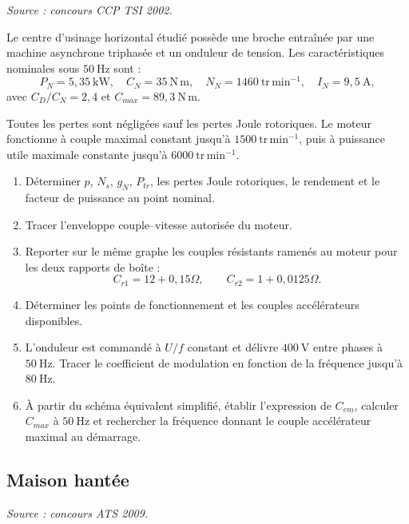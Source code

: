 \textit{Source : concours CCP TSI 2002.}

\begin{minipage}{.72\linewidth}
Le centre d'usinage horizontal étudié possède une broche entraînée par une machine asynchrone triphasée et un onduleur de tension. Les caractéristiques nominales sous $50\ \mathrm{Hz}$ sont :
\[
P_N=5{,}35\ \mathrm{kW},\quad C_N=35\ \mathrm{N\,m},\quad
N_N=1460\ \mathrm{tr\,min^{-1}},\quad I_N=9{,}5\ \mathrm A,
\]
avec $C_D/C_N=2{,}4$ et $C_{max}=89{,}3\ \mathrm{N\,m}$.
\end{minipage}\hfill
\begin{minipage}{.24\linewidth}
\end{minipage}

Toutes les pertes sont négligées sauf les pertes Joule rotoriques. Le moteur fonctionne à couple maximal constant jusqu'à $1500\ \mathrm{tr\,min^{-1}}$, puis à puissance utile maximale constante jusqu'à $6000\ \mathrm{tr\,min^{-1}}$.

\begin{enumerate}
  \item Déterminer $p$, $N_s$, $g_N$, $P_{tr}$, les pertes Joule rotoriques, le rendement et le facteur de puissance au point nominal.
  \item Tracer l'enveloppe couple--vitesse autorisée du moteur.
  \item Reporter sur le même graphe les couples résistants ramenés au moteur pour les deux rapports de boîte :
  \[
  C_{r1}=12+0{,}15\Omega,
  \qquad
  C_{r2}=1+0{,}0125\Omega.
  \]
  \item Déterminer les points de fonctionnement et les couples accélérateurs disponibles.
  \item L'onduleur est commandé à $U/f$ constant et délivre $400\ \mathrm V$ entre phases à $50\ \mathrm{Hz}$. Tracer le coefficient de modulation en fonction de la fréquence jusqu'à $80\ \mathrm{Hz}$.
  \item À partir du schéma équivalent simplifié, établir l'expression de $C_{em}$, calculer $C_{max}$ à $50\ \mathrm{Hz}$ et rechercher la fréquence donnant le couple accélérateur maximal au démarrage.
\end{enumerate}

\subsection{Maison hantée}

\textit{Source : concours ATS 2009.}

